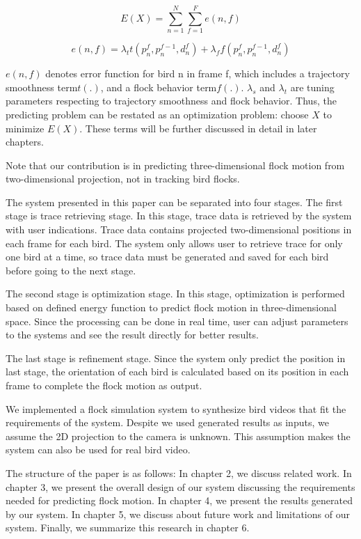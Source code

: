 \begin{equation}\label{eq:1}
 E(X) = \sum_{n = 1}^{N} \sum_{f = 1}^{F}e(n,f)
\end{equation}


\begin{equation}\label{eq:2}
 e(n,f) = \lambda_tt(p_n^f, p_n^{f-1},d_n^f) + \lambda_ff(p_n^f, p_n^{f-1},d_n^f)
\end{equation}


$e(n,f)$ denotes error function for bird n in frame f, which includes a trajectory smoothness term$t(.)$, and a flock behavior term$f(.)$. $\lambda_s$ and $\lambda_t$ are tuning parameters respecting to trajectory smoothness and flock behavior. Thus, the predicting problem can be restated as an optimization problem: choose $X$ to minimize $E(X)$. These terms will be further discussed in detail in later chapters.


Note that our contribution is in predicting three-dimensional flock motion from two-dimensional projection, not in tracking bird flocks.


The system presented in this paper can be separated into four stages. The first stage is trace retrieving stage. In this stage, trace data is retrieved by the system with user indications. Trace data contains projected two-dimensional positions in each frame for each bird. The system only allows user to retrieve trace for only one bird at a time, so trace data must be generated and saved for each bird before going to the next stage.


The second stage is optimization stage. In this stage, optimization is performed based on defined energy function to predict flock motion in three-dimensional space. Since the processing can be done in real time, user can adjust parameters to the systems and see the result directly for better results.


The last stage is refinement stage. Since the system only predict the position in last stage, the orientation of each bird is calculated based on its position in each frame to complete the flock motion as output.


We implemented a flock simulation system to synthesize bird videos that fit the requirements of the system. Despite we used generated results as inputs, we assume the 2D projection to the camera is unknown. This assumption makes the system can also be used for real bird video.


The structure of the paper is as follows: In chapter 2, we discuss related work. In chapter 3, we present the overall design of our system discussing the requirements needed for predicting flock motion. In chapter 4, we present the results generated by our system. In chapter 5, we discuss about future work and limitations of our system. Finally, we summarize this research in chapter 6.

